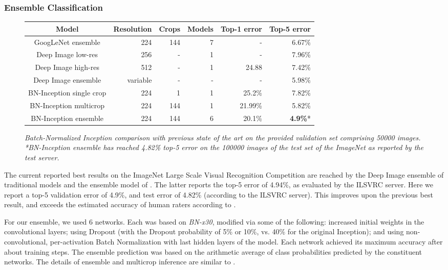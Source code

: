 \documentclass[twocolumn]{article}
\begin{document}
\subsubsection{Ensemble Classification}

\begin{figure*}[t!]
\centering
\begin{tabular}{c | r  r  r  r  r }
\hline
Model & Resolution & Crops & Models & Top-1 error & Top-5 error \\ 
\hline
{GoogLeNet ensemble} & 224 & 144 & 7 & - & 6.67\% \\
{Deep Image low-res} & 256 & - & 1 & - & 7.96\% \\
{Deep Image high-res} & 512 & - & 1 & 24.88 & 7.42\% \\
{Deep Image ensemble} & variable & - & - & - & 5.98\% \\
{BN-Inception single crop} & 224 & 1 & 1 & 25.2\% & 7.82\% \\
{BN-Inception multicrop} & 224 & 144 & 1 & 21.99\% & 5.82\% \\
{BN-Inception ensemble} & 224 & 144 & 6 & 20.1\% & {\bf 4.9\%}* \\
\hline
\end{tabular}
\caption{\em Batch-Normalized Inception comparison with previous state of the art on the provided validation set comprising 50000 images.
  *BN-Inception ensemble has reached 4.82\% top-5 error on the 100000 images of the test set of the ImageNet as reported by the test server. }
\label{fig-classification-comparison}
\end{figure*}

The current reported best results on the ImageNet Large Scale Visual Recognition
Competition are reached by the Deep Image ensemble of traditional models
\cite{deepimage} and the ensemble model of \cite{msr}. The latter reports the
top-5 error of 4.94\%, as evaluated by the ILSVRC server. Here we report a top-5
validation error of 4.9\%, and test error of 4.82\% (according to the ILSVRC
server). This improves upon the previous best result,
and
exceeds the estimated accuracy of human raters according to \cite{imagenet}.



For our ensemble, we used 6 networks. Each was based on {\sl BN-x30},
modified via some of the following: increased initial weights in the
convolutional layers; using Dropout (with the Dropout probability of
5\% or 10\%, vs. 40\% for the original Inception); and using
non-convolutional, per-activation Batch Normalization with last hidden
layers of the model. Each network achieved its maximum accuracy after
about  training steps.  The ensemble prediction was based on
the arithmetic average of class probabilities predicted by the
constituent networks. The details of ensemble and multicrop inference
are similar to \cite{inception}.
\end{document}
